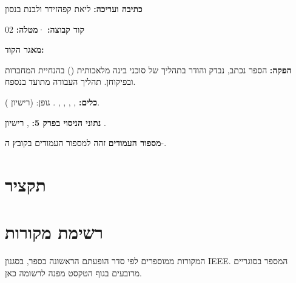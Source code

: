 \documentclass{aibook}
\begin{document}
\frontmatter
{}

\begin{credits}
\textbf{כתיבה ועריכה:} ליאת קפהזידר ולבנת בנסון

\textbf{קוד קבוצה:}  \quad·\quad \textbf{מטלה:} 02

\textbf{מאגר הקוד:} 

\textbf{הפקה:} הספר נכתב, נבדק והודר בתהליך של סוכני בינה מלאכותית () בהנחיית המחברות ובפיקוחן. תהליך העבודה מתועד בנספח.

\textbf{כלים:} , ‏, ‏, ‏, ‏. גופן:  (רישיון ).

\textbf{נתוני הניסוי בפרק 5:} , רישיון .

\textbf{מספור העמודים} זהה למספור העמודים בקובץ ה-.
\end{credits}

\chapter*{תקציר}
\thispagestyle{frontmatter}

\begin{keywordsbox}
\end{keywordsbox}

\tableofcontents
\listoffigures
{\let\clearpage\relax\listoftables}%

\mainmatter








\bookappendix


\backmatter
\chapter*{רשימת מקורות}
המקורות ממוספרים לפי סדר הופעתם הראשונה בספר, בסגנון IEEE. המספר בסוגריים מרובעים בגוף הטקסט מפנה לרשומה כאן.
\begin{english}
\printbibliography[heading=none]
\end{english}
\end{document}
